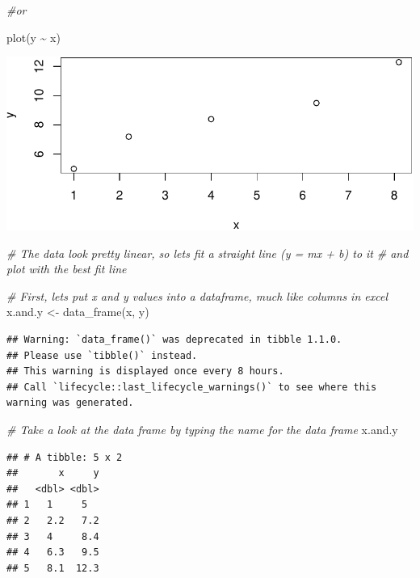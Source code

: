\documentclass[
]{article}
\newenvironment{Shaded}{\begin{snugshade}}{\end{snugshade}}
\newcommand{\CommentTok}[1]{\textcolor[rgb]{0.56,0.35,0.01}{\textit{#1}}}
\newcommand{\FunctionTok}[1]{\textcolor[rgb]{0.00,0.00,0.00}{#1}}
\newcommand{\NormalTok}[1]{#1}
\newcommand{\OtherTok}[1]{\textcolor[rgb]{0.56,0.35,0.01}{#1}}
\newcommand{\SpecialCharTok}[1]{\textcolor[rgb]{0.00,0.00,0.00}{#1}}
\begin{document}
\begin{Shaded}
\begin{Highlighting}[]
\CommentTok{\#or}

\FunctionTok{plot}\NormalTok{(y }\SpecialCharTok{\textasciitilde{}}\NormalTok{ x)}
\end{Highlighting}
\end{Shaded}

\includegraphics{skeleton_files/figure-latex/unnamed-chunk-5-2.pdf}

\begin{Shaded}
\begin{Highlighting}[]
\CommentTok{\# The data look pretty linear, so let\textquotesingle{}s fit a straight line (y = mx + b) to it }
\CommentTok{\# and plot with the best fit line}

\CommentTok{\# First, let\textquotesingle{}s put x and y values into a dataframe, much like columns in excel}
\NormalTok{x.and.y }\OtherTok{\textless{}{-}} \FunctionTok{data\_frame}\NormalTok{(x, y) }
\end{Highlighting}
\end{Shaded}

\begin{verbatim}
## Warning: `data_frame()` was deprecated in tibble 1.1.0.
## Please use `tibble()` instead.
## This warning is displayed once every 8 hours.
## Call `lifecycle::last_lifecycle_warnings()` to see where this warning was generated.
\end{verbatim}

\begin{Shaded}
\begin{Highlighting}[]
\CommentTok{\# Take a look at the data frame by typing the name for the data frame}
\NormalTok{x.and.y}
\end{Highlighting}
\end{Shaded}

\begin{verbatim}
## # A tibble: 5 x 2
##       x     y
##   <dbl> <dbl>
## 1   1     5  
## 2   2.2   7.2
## 3   4     8.4
## 4   6.3   9.5
## 5   8.1  12.3
\end{verbatim}
\end{document}
